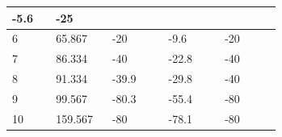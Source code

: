 \documentclass[UTF8,10pt,a4paper,fontset=fandol]{ctexart}
\newcommand{\fieldvalue}[1]{#1}
\begin{document}
\begin{center}
\begin{tabular}{|p{0.14\linewidth}|p{0.18\linewidth}|p{0.18\linewidth}|p{0.18\linewidth}|p{0.18\linewidth}|}
\fieldvalue{-5.6} &
\fieldvalue{-25}\\
\hline
6 &
\fieldvalue{65.867} &
\fieldvalue{-20} &
\fieldvalue{-9.6} &
\fieldvalue{-20}\\
\hline
7 &
\fieldvalue{86.334} &
\fieldvalue{-40} &
\fieldvalue{-22.8} &
\fieldvalue{-40}\\
\hline
8 &
\fieldvalue{91.334} &
\fieldvalue{-39.9} &
\fieldvalue{-29.8} &
\fieldvalue{-40}\\
\hline
9 &
\fieldvalue{99.567} &
\fieldvalue{-80.3} &
\fieldvalue{-55.4} &
\fieldvalue{-80}\\
\hline
10 &
\fieldvalue{159.567} &
\fieldvalue{-80} &
\fieldvalue{-78.1} &
\fieldvalue{-80}\\
\hline
\end{tabular}
\end{center}
\end{document}
